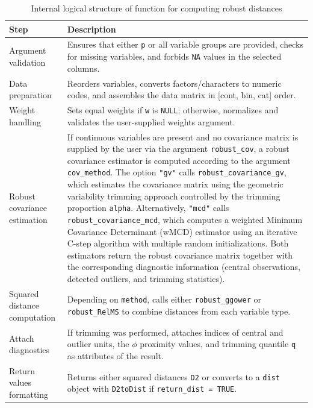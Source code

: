 \begin{table}[h!]
\caption{Internal logical structure of function for computing robust distances}
\label{tab:modular-structure-aggregate}
\label{ref:table8}
\begin{center}
{\footnotesize
\begin{tabular}{|p{3.5cm}|p{10.2cm}|}
\hline
\textbf{Step} & \textbf{Description} \\
\hline
Argument validation & Ensures that either \texttt{p} or all variable groups are provided, checks for missing variables, and forbids \texttt{NA} values in the selected columns. \\
\hline
Data preparation & Reorders variables, converts factors/characters to numeric codes, and assembles the data matrix in [cont, bin, cat] order. \\
\hline
Weight handling & Sets equal weights if \texttt{w} is \texttt{NULL}; otherwise, normalizes and validates the user-supplied weights argument. \\
\hline
Robust covariance estimation & If continuous variables are present and no covariance matrix is supplied by the user via the argument \texttt{robust\_cov}, a robust covariance estimator is computed according to the argument \texttt{cov\_method}. The option \texttt{"gv"} calls \texttt{robust\_covariance\_gv}, which estimates the covariance matrix using the geometric variability trimming approach controlled by the trimming proportion \texttt{alpha}. Alternatively, \texttt{"mcd"} calls \texttt{robust\_covariance\_mcd}, which computes a weighted Minimum Covariance Determinant (wMCD) estimator using an iterative C-step algorithm with multiple random initializations. Both estimators return the robust covariance matrix together with the corresponding diagnostic information (central observations, detected outliers, and trimming statistics). \\
\hline
Squared distance computation & Depending on \texttt{method}, calls either \texttt{robust\_ggower} or \texttt{robust\_RelMS} to combine distances from each variable type. \\
\hline
Attach diagnostics & If trimming was performed, attaches indices of central and outlier units, the $\phi$ proximity values, and trimming quantile \texttt{q} as attributes of the result. \\
\hline
Return values formatting & Returns either squared distances \texttt{D2} or converts to a \texttt{dist} object with \texttt{D2toDist} if \texttt{return\_dist = TRUE}. \\
\hline
\end{tabular}}
\end{center}
\end{table}


